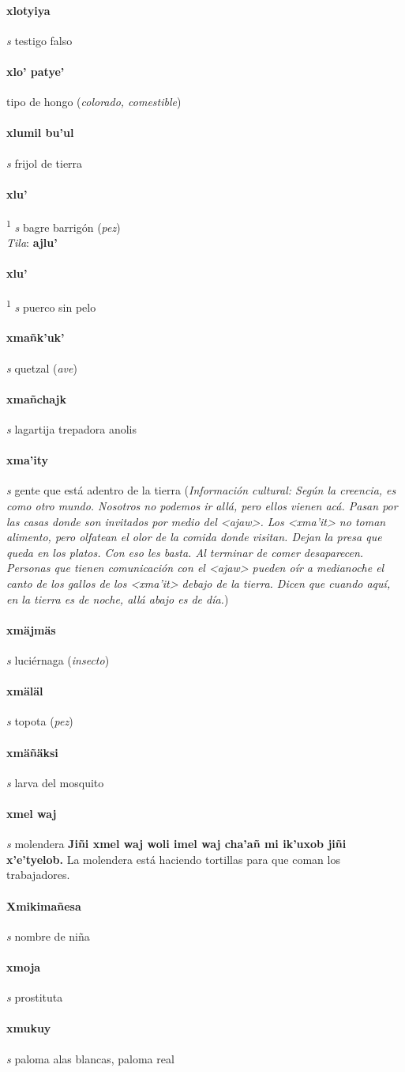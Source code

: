 \documentclass{scrbook}
\newcommand{\entry}[1]{\paragraph{#1}}
\newcommand{\defsuperscript}[1]{\textsuperscript{1}}
\newcommand{\partofspeech}[1]{\textit{#1}}
\newcommand{\spanishtranslation}[1]{#1}
\newcommand{\clarification}[1]{(\textit{#1})}
\newcommand{\cholexample}[1]{\textbf{#1}}
\newcommand{\exampletranslation}[1]{#1}
\newcommand{\dialectvariant}[1]{\\\textit{#1}:}
\newcommand{\dialectword}[1]{\textbf{#1}}
\newcommand{\culturalinformation}[1]{(\textit{#1})}
\begin{document}
\begin{multicols}{2}
\entry{xlotyiya}
\partofspeech{s}
\spanishtranslation{testigo falso}

\entry{xlo' patye'}
\spanishtranslation{tipo de hongo}
\clarification{colorado, comestible}

\entry{xlumil bu'ul}
\partofspeech{s}
\spanishtranslation{frijol de tierra}

\entry{xlu'}
\defsuperscript{1}
\partofspeech{s}
\spanishtranslation{bagre barrigón}
\clarification{pez}
\dialectvariant{Tila}
\dialectword{ajlu'}

\entry{xlu'}
\defsuperscript{2}
\partofspeech{s}
\spanishtranslation{puerco sin pelo}

\entry{xmañk'uk'}
\partofspeech{s}
\spanishtranslation{quetzal}
\clarification{ave}

\entry{xmañchajk}
\partofspeech{s}
\spanishtranslation{lagartija trepadora}
\spanishtranslation{anolis}

\entry{xma'ity}
\partofspeech{s}
\spanishtranslation{gente que está adentro de la tierra}
\culturalinformation{Información cultural: Según la creencia, es como otro mundo. Nosotros no podemos ir allá, pero ellos vienen acá. Pasan por las casas donde son invitados por medio del <ajaw>. Los <xma'it> no toman alimento, pero olfatean el olor de la comida donde visitan. Dejan la presa que queda en los platos. Con eso les basta. Al terminar de comer desaparecen. Personas que tienen comunicación con el <ajaw> pueden oír a medianoche el canto de los gallos de los <xma'it> debajo de la tierra. Dicen que cuando aquí, en la tierra es de noche, allá abajo es de día.}

\entry{xmäjmäs}
\partofspeech{s}
\spanishtranslation{luciérnaga}
\clarification{insecto}

\entry{xmäläl}
\partofspeech{s}
\spanishtranslation{topota}
\clarification{pez}

\entry{xmäñäksi}
\partofspeech{s}
\spanishtranslation{larva del mosquito}

\entry{xmel waj}
\partofspeech{s}
\spanishtranslation{molendera}
\cholexample{Jiñi xmel waj woli imel waj cha'añ mi ik'uxob jiñi x'e'tyelob.}
\exampletranslation{La molendera está haciendo tortillas para que coman los trabajadores.}

\entry{Xmikimañesa}
\partofspeech{s}
\spanishtranslation{nombre de niña}

\entry{xmoja}
\partofspeech{s}
\spanishtranslation{prostituta}

\entry{xmukuy}
\partofspeech{s}
\spanishtranslation{paloma alas blancas, paloma real}


\end{multicols}
\end{document}
